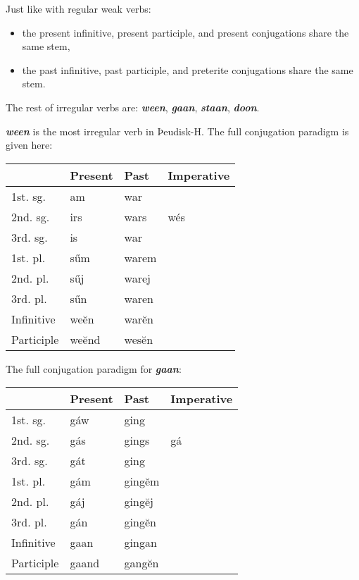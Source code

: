 Just like with regular weak verbs:

\begin{itemize}
\item the present infinitive, present participle, and present conjugations share the same stem,
\item the past infinitive, past participle, and preterite conjugations share the same stem.
\end{itemize}

The rest of irregular verbs are: \textbf{\emph{ween}}, \textbf{\emph{gaan}}, \textbf{\emph{staan}}, \textbf{\emph{doon}}. 

\textbf{\emph{ween}} is the most irregular verb in Þeudisk-H. The full conjugation paradigm is given here:

\begin{center}
\begin{tabular}{llll}
& Present & Past & Imperative \\
\hline
1st. sg. & am  & war   &     \\
2nd. sg. & irs & wars  & wés \\
3rd. sg. & is  & war   &     \\
1st. pl. & sűm & warem &     \\
2nd. pl. & sűj & warej &     \\
3rd. pl. & sűn & waren &     \\
\hline
Infinitive & weĕn  & warĕn  \\
Participle & weĕnd & wesĕn \\
\end{tabular}
\end{center}

The full conjugation paradigm for \textbf{\emph{gaan}}:

\begin{center}
\begin{tabular}{llll}
& Present & Past & Imperative \\
\hline
1st. sg. & gáw & ging  & \\
2nd. sg. & gás & gings & gá \\
3rd. sg. & gát & ging  & \\
1st. pl. & gám & gingĕm & \\
2nd. pl. & gáj & gingĕj & \\
3rd. pl. & gán & gingĕn & \\
\hline
Infinitive & gaan & gingan \\
Participle & gaand & gangĕn \\
\end{tabular}    
\end{center}

